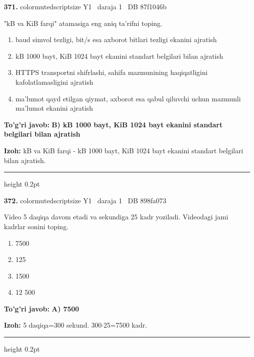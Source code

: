 \documentclass[10pt,a4paper,oneside]{article}
\begin{document}
\noindent\textbf{\color{ink}371.}  {color{muted}scriptsize Y1 \textbullet\ daraja 1 \textbullet\ DB 87f1046b}
\par
"kB va KiB farqi" atamasiga eng aniq ta'rifni toping.
\begin{enumerate}[label=\Alph*),leftmargin=9mm]
\item baud simvol tezligi, bit/s esa axborot bitlari tezligi ekanini ajratish
\item kB 1000 bayt, KiB 1024 bayt ekanini standart belgilari bilan ajratish
\item HTTPS transportni shifrlashi, sahifa mazmunining haqiqatligini kafolatlamasligini ajratish
\item ma'lumot qayd etilgan qiymat, axborot esa qabul qiluvchi uchun mazmunli ma'lumot ekanini ajratish
\end{enumerate}
\begin{tcolorbox}[enhanced,breakable,colback=teal!4,colframe=teal!50!black,boxrule=0.5pt,arc=1.1mm,left=3mm,right=3mm,top=1.7mm,bottom=1.7mm,before skip=2mm,after skip=2mm]
\textbf{\color{teal}To'g'ri javob:} \textbf{B) kB 1000 bayt, KiB 1024 bayt ekanini standart belgilari bilan ajratish}
\par\smallskip
\textbf{Izoh:} kB va KiB farqi - kB 1000 bayt, KiB 1024 bayt ekanini standart belgilari bilan ajratish.
\end{tcolorbox}
\vspace{2mm}\hrule height 0.2pt \vspace{3mm}

\noindent\textbf{\color{ink}372.}  {color{muted}scriptsize Y1 \textbullet\ daraja 1 \textbullet\ DB 898fa073}
\par
Video 5 daqiqa davom etadi va sekundiga 25 kadr yoziladi. Videodagi jami kadrlar sonini toping.
\begin{enumerate}[label=\Alph*),leftmargin=9mm]
\item 7500
\item 125
\item 1500
\item 12 500
\end{enumerate}
\begin{tcolorbox}[enhanced,breakable,colback=teal!4,colframe=teal!50!black,boxrule=0.5pt,arc=1.1mm,left=3mm,right=3mm,top=1.7mm,bottom=1.7mm,before skip=2mm,after skip=2mm]
\textbf{\color{teal}To'g'ri javob:} \textbf{A) 7500}
\par\smallskip
\textbf{Izoh:} 5 daqiqa=300 sekund. 300\ensuremath{\cdot}25=7500 kadr.
\end{tcolorbox}
\vspace{2mm}\hrule height 0.2pt \vspace{3mm}
\end{document}
